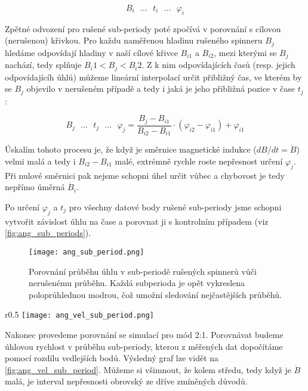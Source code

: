 $$
    B_i \text{ } \ldots \text{ } t_i \text{ } \ldots \text{ } \varphi_i
$$

Zpětné odvození pro rušené sub-periody poté zpočívá v porovnání s cílovou (nerušenou) křivkou. Pro každu naměřenou hladinu rušeného spinneru $B_j$ hledáme odpovídají hladiny v naší cílové křivce $B_{i1}$ a $B_{i2}$, mezi kterými se $B_j$ nachází, tedy splňuje $B_i1 < B_j < B_i2$. Z k nim odpovídajících časů (resp. jejich odpovídajícíh úhlů) můžeme lineární interpolací určit přibližný čas, ve kterém by se $B_j$ objevilo v nerušeném případě a tedy i jaká je jeho přibližná pozice v čase $t_j$:

$$
    B_j \text{ } \ldots \text{ } t_j \text{ } \ldots \text{ } \varphi_j = \frac{B_j - B_{i1}}{B_{i2} - B_{i1}} \cdot (\varphi_{i2} - \varphi_{i1}) + \varphi_{i1}
$$

Úskalím tohoto procesu je, že když je směrnice magnetické indukce ($dB/dt = \dot{B}$) velmi malá a tedy i $B_{i2} - B_{i1}$ malé, extrémně rychle roste nepřesnost určení $\varphi_j$. Při nulové směrnici pak nejsme schopni úhel určit vůbec a chybovost je tedy nepřímo úměrná $\dot{B_i}$.

Po určení $\varphi_j$ a $t_j$ pro všechny datové body rušené sub-periody jsme schopni vytvořit závislost úhlu na čase a porovnat ji s kontrolním případem (viz \autoref{fig:ang_sub_periods}). 

\clearpage

\begin{figure}[H]
    \texttt{[image: ang\_sub\_period.png]}
    \centering
    \caption[Porovnání průběhu úhlu v sub-periodě rušených spinnerů vůči nerušenému průběhu]{Porovnání průběhu úhlu v sub-periodě rušených spinnerů vůči nerušenému průběhu. Každá subperioda je opět vykreslena poloprůhlednou modrou, čož umožní sledování nejčastějších průběhů.}
    \label{fig:ang_sub_periods}
\end{figure}

\begin{wrapfigure}{r}{0.5\textwidth}
    \texttt{[image: ang\_vel\_sub\_period.png]}
    \centering
    \caption{Porovnání měřeného a simulovaného průběhu úhlové rychlosti v čase pro mód 2:1}
    \label{fig:ang_vel_sub_period}
\end{wrapfigure}

Nakonec provedeme porovnání se simulací pro mód 2:1. Porovnávat budeme úhlovou rychlost v průběhu sub-periody, kterou z měřených dat dopočítáme pomocí rozdílu vedlejších bodů. Výsledný graf lze vidět na \ref{fig:ang_vel_sub_period}. Můžeme si všimnout, že kolem středu, tedy když je $\dot{B}$ malá, je interval nepřesnosti obrovský ze dříve zmíněných důvodů.

